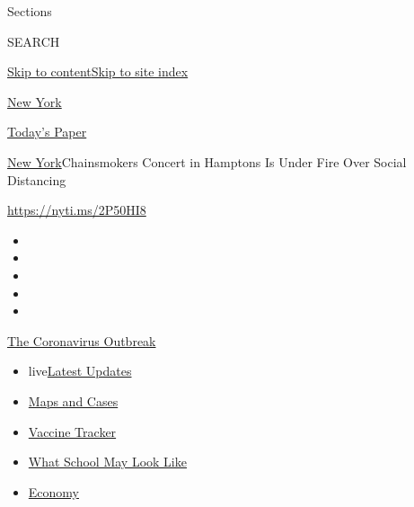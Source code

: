 Sections

SEARCH

\protect\hyperlink{site-content}{Skip to
content}\protect\hyperlink{site-index}{Skip to site index}

\href{https://www.nytimes.com/section/nyregion}{New York}

\href{https://myaccount.nytimes.com/auth/login?response_type=cookie\&client_id=vi}{}

\href{https://www.nytimes.com/section/todayspaper}{Today's Paper}

\href{/section/nyregion}{New York}\textbar{}Chainsmokers Concert in
Hamptons Is Under Fire Over Social Distancing

\url{https://nyti.ms/2P50HI8}

\begin{itemize}
\item
\item
\item
\item
\item
\end{itemize}

\href{https://www.nytimes.com/news-event/coronavirus?action=click\&pgtype=Article\&state=default\&region=TOP_BANNER\&context=storylines_menu}{The
Coronavirus Outbreak}

\begin{itemize}
\tightlist
\item
  live\href{https://www.nytimes.com/2020/08/02/world/coronavirus-updates.html?action=click\&pgtype=Article\&state=default\&region=TOP_BANNER\&context=storylines_menu}{Latest
  Updates}
\item
  \href{https://www.nytimes.com/interactive/2020/us/coronavirus-us-cases.html?action=click\&pgtype=Article\&state=default\&region=TOP_BANNER\&context=storylines_menu}{Maps
  and Cases}
\item
  \href{https://www.nytimes.com/interactive/2020/science/coronavirus-vaccine-tracker.html?action=click\&pgtype=Article\&state=default\&region=TOP_BANNER\&context=storylines_menu}{Vaccine
  Tracker}
\item
  \href{https://www.nytimes.com/interactive/2020/07/29/us/schools-reopening-coronavirus.html?action=click\&pgtype=Article\&state=default\&region=TOP_BANNER\&context=storylines_menu}{What
  School May Look Like}
\item
  \href{https://www.nytimes.com/live/2020/07/31/business/stock-market-today-coronavirus?action=click\&pgtype=Article\&state=default\&region=TOP_BANNER\&context=storylines_menu}{Economy}
\end{itemize}

